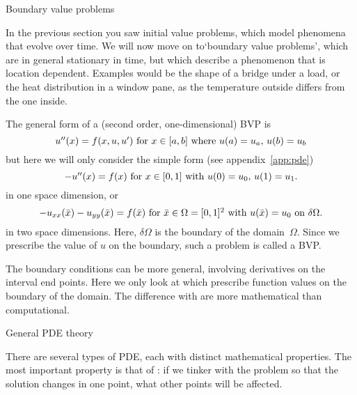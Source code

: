 

 {Boundary value problems}
\label{sec:bvp}

In the previous section you saw initial value problems, which model
phenomena that evolve over time. We will now move on to`boundary value
problems', which are in general stationary in time, but which describe
a phenomenon that is location dependent. Examples would be the shape
of a bridge under a load, or the heat distribution in a window pane,
as the temperature outside differs from the one inside.

The general form of a (second order, one-dimensional) \ac{BVP} is
\begin{equation}
  \hbox{$u''(x)=f(x,u,u')$ for $x\in[a,b]$ where $u(a)=u_a$,
    $u(b)=u_b$}
\end{equation}
but here we will only consider the simple form
(see appendix~\ref{app:pde})
\begin{equation}
 \hbox{$-u''(x)=f(x)$ for $x\in[0,1]$ with $u(0)=u_0$, $u(1)=u_1$.}
 \label{eq:2nd-order-bvp}
 \end{equation}
in one space dimension, or
\begin{equation}
 \hbox{$-u_{xx}(\bar x)-u_{yy}(\bar x)=f(\bar x)$ for
   $\bar x\in\Omega=[0,1]^2$ 
    with $u(\bar x)=u_0$ on $\delta\Omega$.}
 \label{eq:2nd-order-bvp-2D}
 \end{equation}
in two space dimensions. Here, $\delta\Omega$ is the boundary of the
domain~$\Omega$. Since we prescribe the value of $u$ on the boundary,
such a problem is called a \acf{BVP}.

\begin{remark}
  The boundary conditions can be more general, involving 
  derivatives on the interval end points. Here we only look at
  which prescribe function values on the boundary of the
  domain.
  The difference with 
  are more mathematical than computational.
\end{remark}


 {General PDE theory}
\label{sec:region-influence}

There are several types of \ac{PDE}, each with distinct mathematical
properties. The most important property is that of : if we tinker with the problem so that the solution
changes in one point, what other points will be affected.

